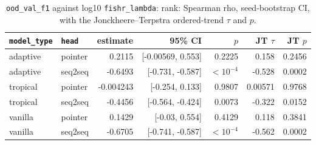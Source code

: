 \documentclass[10pt]{article}
\begin{document}
{\small
\begin{longtable}{llrrrrr}
\caption{\texttt{ood\_val\_f1} against log10 \texttt{fishr\_lambda}: rank: Spearman rho, seed-bootstrap CI, with the Jonckheere--Terpstra ordered-trend $\tau$ and $p$.}\label{tab:trend-ood_val_f1}\\
\toprule
\texttt{model\_type} & \texttt{head} & estimate & 95\% CI & $p$ & JT $\tau$ & JT $p$\\
\midrule
\endhead
adaptive & pointer & 0.2115 & [-0.00569, 0.553] & 0.2225 & 0.158 & 0.2456\\
adaptive & seq2seq & -0.6493 & [-0.731, -0.587] & $<10^{-4}$ & -0.528 & 0.0002\\
tropical & pointer & -0.004243 & [-0.254, 0.133] & 0.9807 & 0.00571 & 0.9768\\
tropical & seq2seq & -0.4456 & [-0.564, -0.424] & 0.0073 & -0.322 & 0.0152\\
vanilla & pointer & 0.1429 & [-0.03, 0.554] & 0.4129 & 0.118 & 0.3841\\
vanilla & seq2seq & -0.6705 & [-0.741, -0.587] & $<10^{-4}$ & -0.562 & 0.0002\\
\bottomrule
\end{longtable}
}
\end{document}
